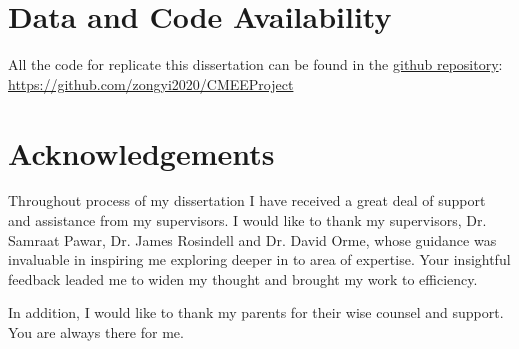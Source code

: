 \documentclass[a4paper]{article}
\begin{document}



\newpage
\section*{Data and Code Availability}
All the code for replicate this dissertation can be found in the \href{https://github.com/zongyi2020/CMEEProject}{github repository}: \url{https://github.com/zongyi2020/CMEEProject}

\newpage
\section*{Acknowledgements}

Throughout process of my dissertation I have received a great deal of support and assistance from my supervisors. I would like to thank my supervisors, Dr. Samraat Pawar, Dr. James Rosindell and Dr. David Orme, whose guidance was invaluable in inspiring me exploring deeper in to area of expertise. Your insightful feedback leaded me to widen my thought and brought my work to efficiency.



In addition, I would like to thank my parents for their wise counsel and support. You are always there for me. %


\clearpage



\newpage

\end{document}

